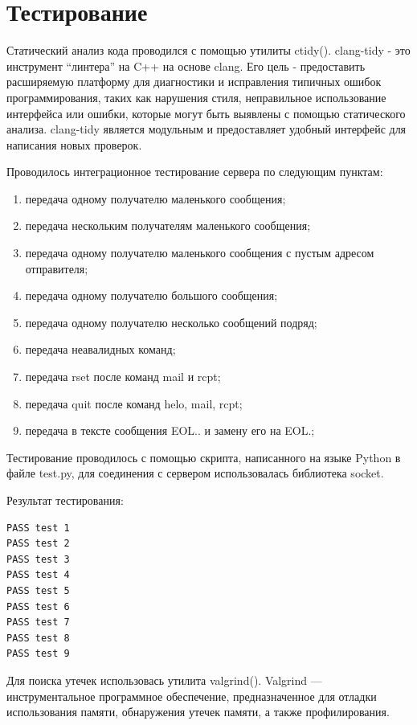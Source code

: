 \documentclass[a4paper,12pt]{report}
\begin{document}
\newpage


\section{Тестирование}
Статический анализ кода проводился с помощью утилиты ctidy(\cite{ctidy}). clang-tidy - это инструмент “линтера” на C++ на основе clang. Его цель - предоставить расширяемую платформу для диагностики и исправления типичных ошибок программирования, таких как нарушения стиля, неправильное использование интерфейса или ошибки, которые могут быть выявлены с помощью статического анализа. clang-tidy является модульным и предоставляет удобный интерфейс для написания новых проверок.

Проводилось интеграционное тестирование сервера по следующим пунктам:
\begin{enumerate}
	\item передача одному получателю маленького сообщения;
	\item передача нескольким получателям маленького сообщения;
	\item передача одному получателю маленького сообщения с пустым адресом отправителя;
    \item передача одному получателю большого сообщения;
    \item передача одному получателю несколько сообщений подряд;
    \item передача неавалидных команд;
    \item передача rset после команд mail и rcpt;
    \item передача quit после команд helo, mail, rcpt;
    \item передача в тексте сообщения EOL.. и замену его на EOL.;
\end{enumerate}

Тестирование проводилось с помощью скрипта, написанного на языке Python в файле test.py, для соединения с сервером использовалась библиотека socket.

Результат тестирования:
\begin{verbatim}
PASS test 1
PASS test 2
PASS test 3
PASS test 4
PASS test 5
PASS test 6
PASS test 7
PASS test 8
PASS test 9
\end{verbatim}


Для поиска утечек использовась утилита valgrind(\cite{valgrind}). Valgrind — инструментальное программное обеспечение, предназначенное для отладки использования памяти, обнаружения утечек памяти, а также профилирования. 
\end{document}
